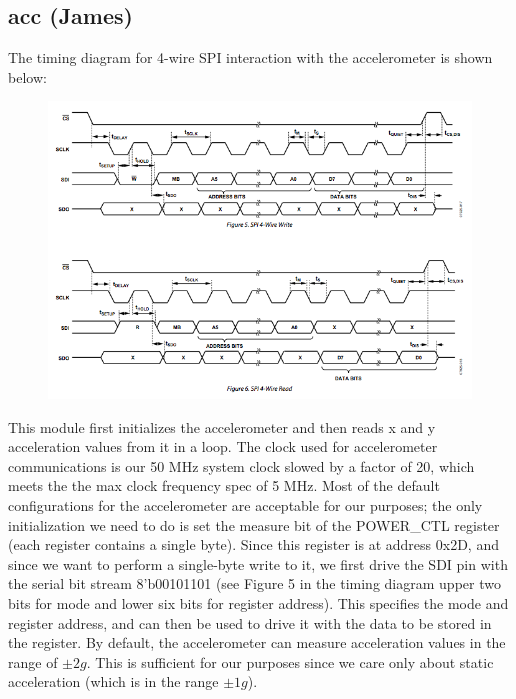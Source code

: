 \documentclass{article}
\begin{document}
\subsection{acc (James)}
The timing diagram for 4-wire SPI interaction with the accelerometer is shown below:

\begin{center}
\begin{figure}[H]
\label{fig:acc_timing}
\centering
\includegraphics[width=\textwidth]{./img/acc_timing}
\end{figure}
\end{center}

This module first initializes the accelerometer and then reads x and y acceleration values from it in a loop.
The clock used for accelerometer communications is our 50 MHz system clock slowed by a factor of 20, which meets the the max clock frequency spec of 5 MHz.
Most of the default configurations for the accelerometer are acceptable for our purposes;
the only initialization we need to do is set the measure bit of the POWER\_CTL register (each register contains a single byte).
Since this register is at address 0x2D, and since we want to perform a single-byte write to it,
we first drive the SDI pin with the serial bit stream 8'b00101101 (see Figure 5 in the timing diagram upper two bits for mode and lower six bits for register address).
This specifies the mode and register address, and can then be used to drive it with the data to be stored in the register.
By default, the accelerometer can measure acceleration values in the range of $\pm 2g$.
This is sufficient for our purposes since we care only about static acceleration (which is in the range $\pm 1g$).
\end{document}
